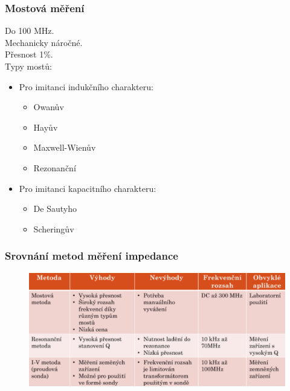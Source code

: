 \subsubsection{Mostová měření}
Do 100 MHz. \\
Mechanicky náročné.\\
Přesnost 1\%.\\
Typy mostů:
\begin{itemize}
    \item Pro imitanci indukčního charakteru:
          \begin{itemize}
              \item Owanův
              \item Hayův
              \item Maxwell-Wienův
              \item Rezonanční
          \end{itemize}
    \item Pro imitanci kapacitního charakteru:
          \begin{itemize}
              \item De Sautyho
              \item Scheringův
          \end{itemize}
\end{itemize}

\subsubsection{Srovnání metod měření impedance}

\begin{figure}[h!]
    \centering
    \includegraphics[scale = 0.4]{images/srovnani.png}
\end{figure}

